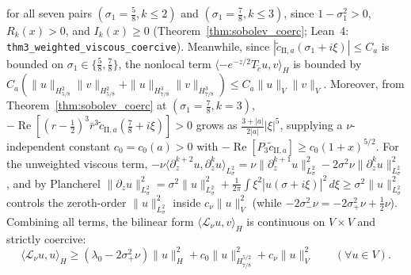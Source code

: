 \documentclass[11pt,a4paper]{article}
\begin{document}
for all seven pairs $(\sigma_1 = \frac{5}{8}, k\le 2)$ and $(\sigma_1 = \frac{7}{8}, k\le 3)$, since $1 - \sigma_1^2 > 0$, $R_k(x) > 0$, and $I_k(x) \ge 0$ (Theorem~\ref{thm:sobolev_coerc}; Lean~4: \texttt{thm3\_weighted\_viscous\_coercive}). Meanwhile, since $|\tilde c_{\mathrm{II},a}(\sigma_1 + i\xi)| \le C_a$ is bounded on $\sigma_1 \in \{\frac{5}{8}, \frac{7}{8}\}$, the nonlocal term $\langle -e^{-z/2}T_{\tilde c}u, v\rangle_H$ is bounded by $C_a(\|u\|_{H^2_{5/8}}\|v\|_{H^2_{5/8}} + \|u\|_{H^3_{7/8}}\|v\|_{H^3_{7/8}}) \le C_a\|u\|_V\|v\|_V$. Moreover, from Theorem~\ref{thm:sobolev_coerc} at $(\sigma_1 = \frac{7}{8}, k=3)$, $-\operatorname{Re}[(r-\frac{1}{2})^3\bar r^3\tilde c_{\mathrm{II},a}(\frac{7}{8}+i\xi)] > 0$ grows as $\frac{3+|a|}{2|a|}|\xi|^5$, supplying a $\nu$-independent constant $c_0 = c_0(a) > 0$ with $-\operatorname{Re}[P_3\tilde c_{\mathrm{II},a}] \ge c_0(1+x)^{5/2}$. For the unweighted viscous term, $-\nu\langle \partial_z^{k+2} u, \partial_z^k u\rangle_{L^2_\sigma} = \nu\|\partial_z^{k+1} u\|_{L^2_\sigma}^2 - 2\sigma^2\nu\|\partial_z^k u\|_{L^2_\sigma}^2$, and by Plancherel $\|\partial_z u\|_{L^2_\sigma}^2 = \sigma^2\|u\|_{L^2_\sigma}^2 + \frac{1}{2\pi}\int \xi^2|\widehat{u}(\sigma+i\xi)|^2\,d\xi \ge \sigma^2\|u\|_{L^2_\sigma}^2$ controls the zeroth-order $\|u\|_{L^2_\sigma}^2$ inside $c_\nu\|u\|_V^2$ (while $-2\sigma_-^2\nu = -2\sigma_+^2\nu + \frac{1}{2}\nu$). Combining all terms, the bilinear form $\langle \mathcal{L}_\nu u, v\rangle_H$ is continuous on $V \times V$ and strictly coercive:
\begin{equation}\label{eq:Lnu_coerc}
\langle \mathcal{L}_\nu u, u\rangle_H \ge (\lambda_0 - 2\sigma_+^2\nu)\|u\|_H^2 + c_0\|u\|_{H^{5/2}_{7/8}}^2 + c_\nu\|u\|_V^2 \qquad (\forall u \in V).
\end{equation}
\end{document}
